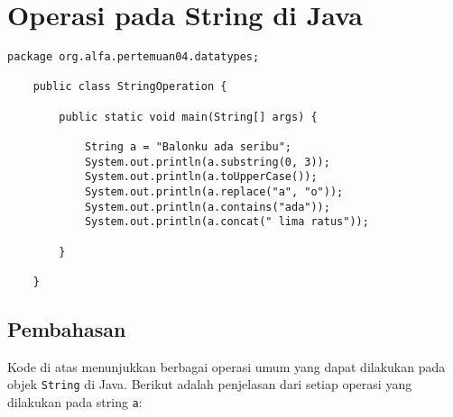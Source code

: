\section{Operasi pada String di Java}

\begin{lstlisting}[style=JavaStyle, caption={Java Code for String Operations}]
	package org.alfa.pertemuan04.datatypes;
	
	public class StringOperation {
		
		public static void main(String[] args) {
			
			String a = "Balonku ada seribu";
			System.out.println(a.substring(0, 3));
			System.out.println(a.toUpperCase());
			System.out.println(a.replace("a", "o"));
			System.out.println(a.contains("ada"));
			System.out.println(a.concat(" lima ratus"));
			
		}
		
	}
\end{lstlisting}

\subsection{Pembahasan}
Kode di atas menunjukkan berbagai operasi umum yang dapat dilakukan pada objek \texttt{String} di Java. Berikut adalah penjelasan dari setiap operasi yang dilakukan pada string \texttt{a}:

